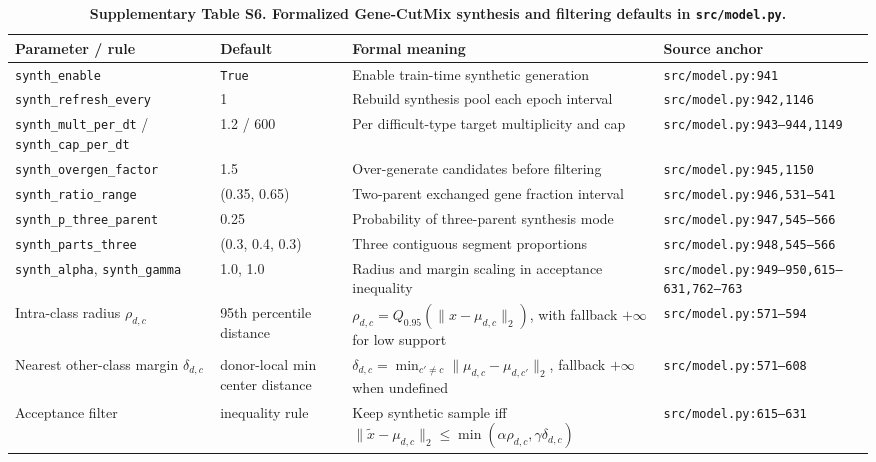 \documentclass[11pt]{article}
\begin{document}
\begin{table}[htbp]
\centering
\caption{\textbf{Supplementary Table S6. Formalized Gene-CutMix synthesis and filtering defaults in \texttt{src/model.py}.}}
\label{tab:s6_genecutmix_defaults}
\renewcommand{\arraystretch}{1.2}
\scriptsize
\begin{tabular}{p{} p{} p{} p{}}
\toprule
\textbf{Parameter / rule} & \textbf{Default} & \textbf{Formal meaning} & \textbf{Source anchor} \\
\midrule
\texttt{synth\_enable} & \texttt{True} & Enable train-time synthetic generation & \texttt{src/model.py:941} \\
\texttt{synth\_refresh\_every} & 1 & Rebuild synthesis pool each epoch interval & \texttt{src/model.py:942,1146} \\
\texttt{synth\_mult\_per\_dt} / \texttt{synth\_cap\_per\_dt} & 1.2 / 600 & Per difficult-type target multiplicity and cap & \texttt{src/model.py:943--944,1149} \\
\texttt{synth\_overgen\_factor} & 1.5 & Over-generate candidates before filtering & \texttt{src/model.py:945,1150} \\
\texttt{synth\_ratio\_range} & (0.35, 0.65) & Two-parent exchanged gene fraction interval & \texttt{src/model.py:946,531--541} \\
\texttt{synth\_p\_three\_parent} & 0.25 & Probability of three-parent synthesis mode & \texttt{src/model.py:947,545--566} \\
\texttt{synth\_parts\_three} & (0.3, 0.4, 0.3) & Three contiguous segment proportions & \texttt{src/model.py:948,545--566} \\
\texttt{synth\_alpha}, \texttt{synth\_gamma} & 1.0, 1.0 & Radius and margin scaling in acceptance inequality & \texttt{src/model.py:949--950,615--631,762--763} \\
Intra-class radius $\rho_{d,c}$ & 95th percentile distance & $\rho_{d,c}=Q_{0.95}\left(\|x-\mu_{d,c}\|_2\right)$, with fallback $+\infty$ for low support & \texttt{src/model.py:571--594} \\
Nearest other-class margin $\delta_{d,c}$ & donor-local min center distance & $\delta_{d,c}=\min_{c'\neq c}\|\mu_{d,c}-\mu_{d,c'}\|_2$, fallback $+\infty$ when undefined & \texttt{src/model.py:571--608} \\
Acceptance filter & inequality rule & Keep synthetic sample iff $\|\tilde{x}-\mu_{d,c}\|_2 \le \min(\alpha \rho_{d,c},\gamma \delta_{d,c})$ & \texttt{src/model.py:615--631} \\
\bottomrule
\end{tabular}
\normalsize
\end{table}
\end{document}
